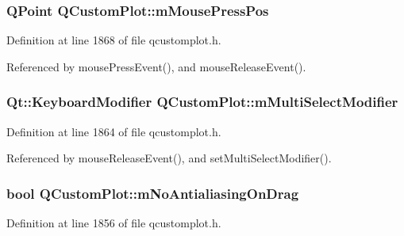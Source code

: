 \subsubsection[{m\+Mouse\+Press\+Pos}]{\setlength{\rightskip}{0pt plus 5cm}Q\+Point Q\+Custom\+Plot\+::m\+Mouse\+Press\+Pos\hspace{0.3cm}{\ttfamily [protected]}}\label{class_q_custom_plot_ac57090da95056ae4dd67be67adfa85bd}


Definition at line 1868 of file qcustomplot.\+h.



Referenced by mouse\+Press\+Event(), and mouse\+Release\+Event().

\hypertarget{class_q_custom_plot_a0e97e701c5671e7e463d2ce0211d0f8a}{}
\subsubsection[{m\+Multi\+Select\+Modifier}]{\setlength{\rightskip}{0pt plus 5cm}Qt\+::\+Keyboard\+Modifier Q\+Custom\+Plot\+::m\+Multi\+Select\+Modifier\hspace{0.3cm}{\ttfamily [protected]}}\label{class_q_custom_plot_a0e97e701c5671e7e463d2ce0211d0f8a}


Definition at line 1864 of file qcustomplot.\+h.



Referenced by mouse\+Release\+Event(), and set\+Multi\+Select\+Modifier().

\hypertarget{class_q_custom_plot_ac83df968435f6b8ec79f2993ab9124e8}{}
\subsubsection[{m\+No\+Antialiasing\+On\+Drag}]{\setlength{\rightskip}{0pt plus 5cm}bool Q\+Custom\+Plot\+::m\+No\+Antialiasing\+On\+Drag\hspace{0.3cm}{\ttfamily [protected]}}\label{class_q_custom_plot_ac83df968435f6b8ec79f2993ab9124e8}


Definition at line 1856 of file qcustomplot.\+h.



